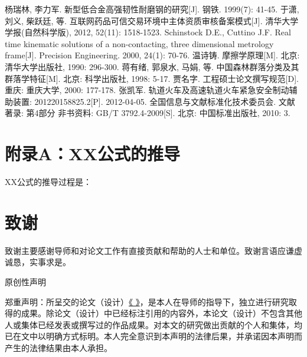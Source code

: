 \documentclass[UTF8,a4paper,12pt]{ctexart}
\numberwithin{equation}{section}
\begin{document}

\begin{thebibliography}{1}
\setlength{\itemsep}{0pt}
 杨瑞林, 李力军. 新型低合金高强韧性耐磨钢的研究[J]. 钢铁. 1999(7): 41-45.
 于潇, 刘义, 柴跃廷, 等. 互联网药品可信交易环境中主体资质审核备案模式[J]. 清华大学学报(自然科学版), 2012, 52(11): 1518-1523.
 Schinstock D.E., Cuttino J.F. Real time kinematic solutions of a non-contacting, three dimensional metrology frame[J]. Precision Engineering. 2000, 24(1): 70-76. 
 温诗铸. 摩擦学原理[M]. 北京: 清华大学出版社, 1990: 296-300.
 蒋有绪, 郭泉水, 马娟, 等. 中国森林群落分类及其群落学特征[M]. 北京: 科学出版社, 1998: 5-17.
 贾名字. 工程硕士论文撰写规范[D]. 重庆: 重庆大学, 2000: 177-178.
 张凯军. 轨道火车及高速轨道火车紧急安全制动辅助装置: 201220158825.2[P]. 2012-04-05.
 全国信息与文献标准化技术委员会. 文献著录: 第4部分 非书资料: GB/T 3792.4-2009[S]. 北京: 中国标准出版社, 2010: 3.
\end{thebibliography}

\newpage
{}

\section*{附录A：XX公式的推导}
XX公式的推导过程是：

\newpage
{}

\section*{致\quad 谢}
致谢主要感谢导师和对论文工作有直接贡献和帮助的人士和单位。致谢言语应谦虚诚恳，实事求是。

\newpage
\thispagestyle{empty}

\begin{center}
\heiti {}
原创性声明
\end{center}

\songti{}
郑重声明：所呈交的论文（设计）\underline{《  \hspace{6em}》}，是本人在导师的指导下，独立进行研究取得的成果。除论文（设计）中已经标注引用的内容外，本论文（设计）不包含其他人或集体已经发表或撰写过的作品成果。对本文的研究做出贡献的个人和集体，均已在文中以明确方式标明。本人完全意识到本声明的法律后果，并承诺因本声明而产生的法律结果由本人承担。
\end{document}
